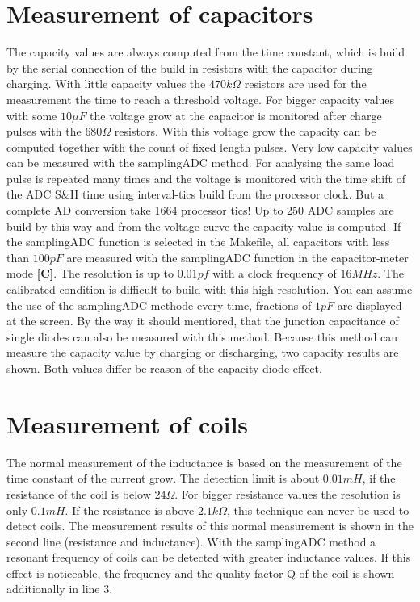 \section{Measurement of capacitors}
The capacity values are always computed from the time constant, which is build by the serial connection of the
build in resistors with the capacitor during charging. With little capacity values the \(470k\Omega\) resistors are
used for the measurement the time to reach a threshold voltage.
For bigger capacity values with some \(10\mu F\) the voltage grow at the capacitor is monitored after charge pulses with the
\(680\Omega\) resistors. With this voltage grow the capacity can be computed together with the count of fixed length pulses.
Very low capacity values can be measured with the samplingADC method.
For analysing the same load pulse is repeated many times and the voltage is monitored with the time shift of the ADC S\&H time
using interval-tics build from the processor clock. But a complete AD conversion take 1664 processor tics!
Up to 250 ADC samples are build by this way and from the voltage curve the capacity value is computed.
If the samplingADC function is selected in the Makefile, all capacitors with less than \(100pF\) are measured with
the samplingADC function in the capacitor-meter mode \textbf{[C]}. The resolution is up to \(0.01pf\) with a clock 
frequency of \(16MHz\). The calibrated condition is difficult to build with this high resolution.
You can assume the use of the samplingADC methode every time, fractions of \(1pF\) are displayed at the screen.
By the way it should mentiored, that the junction capacitance of single diodes can also be measured with
this method. Because this method can measure the capacity value by charging or discharging, two capacity results are shown.
Both values differ be reason of the capacity diode effect.

\section{Measurement of coils}
The normal measurement of the inductance is based on the measurement of the time constant of the current grow.
The detection limit is about \(0.01mH\), if the resistance of the coil is below \(24\Omega\).
For bigger resistance values the resolution is only \(0.1mH\).
If the resistance is above \(2.1k\Omega\), this technique can never be used to detect coils.
The measurement results of this normal measurement is shown in the second line (resistance and inductance).
With the samplingADC method a resonant frequency of coils can be detected with greater inductance values.
If this effect is noticeable, the frequency and the quality factor Q of the coil is shown additionally in line 3. 

